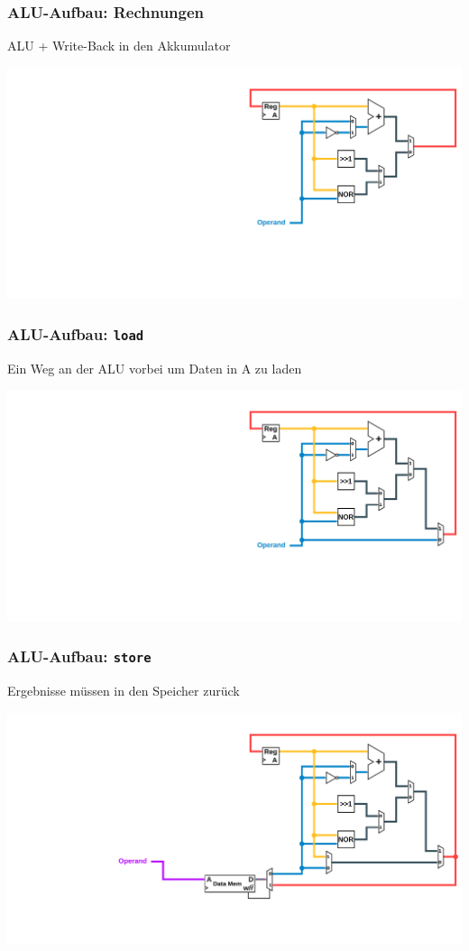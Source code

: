 \documentclass[t,aspectratio=169]{beamer}
\begin{document}
\begin{frame}
  \frametitle{ALU-Aufbau: Rechnungen}

  \strut{}ALU + Write-Back in den Akkumulator

  \begin{center}
    \includegraphics[width=.85\textwidth]{sch-alu.pdf}
  \end{center}
\end{frame}

\begin{frame}
  \frametitle{ALU-Aufbau: \texttt{load}}

  \strut{}Ein Weg an der ALU vorbei um Daten in A zu laden

  \begin{center}
    \includegraphics[width=.85\textwidth]{sch-load.pdf}
  \end{center}
\end{frame}

\begin{frame}
  \frametitle{ALU-Aufbau: \texttt{store}}

  \strut{}Ergebnisse müssen in den Speicher zurück

  \begin{center}
    \includegraphics[width=.85\textwidth]{sch-loadstore.pdf}
  \end{center}
\end{frame}
\end{document}
